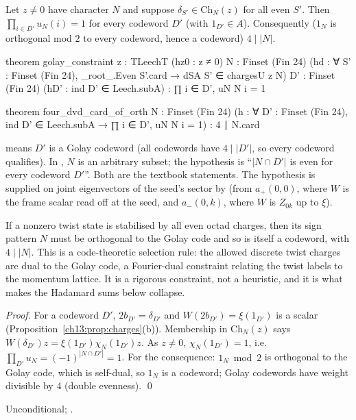 \begin{theorem}\label{ch13:thm:golay-constraint}
Let $z\ne0$ have character $N$ and suppose $\delta_{S'}\in\mathrm{Ch}_N(z)$ for all even $S'$. Then
$\prod_{i\in D'}u_N(i)=1$ for every codeword $D'$ (with $1_{D'}\in A$). Consequently ($1_N$ is orthogonal mod $2$ to every
codeword, hence a codeword) $4\mid|N|$.
\end{theorem}
\begin{leancode}
theorem golay_constraint {z : TLeechT} (hz0 : z ≠ 0) {N : Finset (Fin 24)}
    (hd : ∀ S' : Finset (Fin 24), _root_.Even S'.card → dSA S' ∈ chargesU z N)
    {D' : Finset (Fin 24)} (hD' : ind D' ∈ Leech.subA) : ∏ i ∈ D', uN N i = 1

theorem four_dvd_card_of_orth {N : Finset (Fin 24)}
    (h : ∀ D' : Finset (Fin 24), ind D' ∈ Leech.subA → ∏ i ∈ D', uN N i = 1) : 4 ∣ N.card
\end{leancode}
\begin{dictionary}
 means $D'$ is a Golay codeword (all codewords have $4\mid|D'|$, so every codeword
qualifies). In , $N$ is an arbitrary subset; the hypothesis is ``$|N\cap D'|$ is even
for every codeword $D'$''. Both are the textbook statements. The hypothesis  is supplied on joint
eigenvectors of the seed's sector by  (from $a_+(0,0)$, where $W$ is the frame scalar
read off at the seed, and $a_-(0,k)$, where $W$ is $Z_{0k}$ up to $\xi$).
\end{dictionary}
\begin{physics}
If a nonzero twist state is stabilised by all even octad charges, then its sign pattern $N$ must be orthogonal to the Golay code and so is itself a codeword, with $4\mid|N|$. This is a code-theoretic selection rule: the allowed discrete twist charges are dual to the Golay code, a Fourier-dual constraint relating the twist labels to the momentum lattice. It is a rigorous constraint, not a heuristic, and it is what makes the Hadamard sums below collapse.
\end{physics}
\noindent\emph{Proof.} For a codeword $D'$, $2b_{D'}=\delta_{D'}$ and $W(2b_{D'})=\xi(1_{D'})$ is a scalar
(Proposition~\ref{ch13:prop:charges}(b)). Membership in $\mathrm{Ch}_N(z)$ says $W(\delta_{D'})z=\xi(1_{D'})\chi_N(1_{D'})z$.
As $z\ne0$, $\chi_N(1_{D'})=1$, i.e.\ $\prod_{D'}u_N=(-1)^{|N\cap D'|}=1$. For the consequence: $1_N\bmod2$ is
orthogonal to the Golay code, which is self-dual, so $1_N$ is a codeword; Golay codewords have weight
divisible by $4$ (double evenness). \qed
\begin{status}Unconditional; .\end{status}

